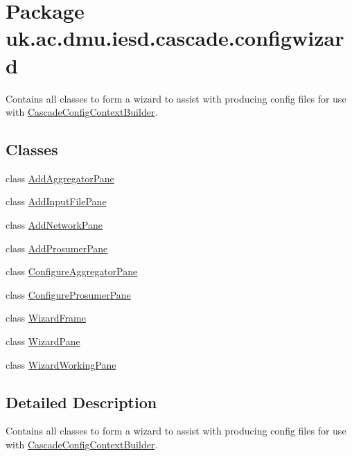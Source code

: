 \hypertarget{namespaceuk_1_1ac_1_1dmu_1_1iesd_1_1cascade_1_1configwizard}{\section{Package uk.\-ac.\-dmu.\-iesd.\-cascade.\-configwizard}
\label{namespaceuk_1_1ac_1_1dmu_1_1iesd_1_1cascade_1_1configwizard}
}


Contains all classes to form a wizard to assist with producing config files for use with \hyperlink{}{Cascade\-Config\-Context\-Builder}.  


\subsection*{Classes}
\begin{DoxyCompactItemize}
\item 
class \hyperlink{classuk_1_1ac_1_1dmu_1_1iesd_1_1cascade_1_1configwizard_1_1_add_aggregator_pane}{Add\-Aggregator\-Pane}
\item 
class \hyperlink{classuk_1_1ac_1_1dmu_1_1iesd_1_1cascade_1_1configwizard_1_1_add_input_file_pane}{Add\-Input\-File\-Pane}
\item 
class \hyperlink{classuk_1_1ac_1_1dmu_1_1iesd_1_1cascade_1_1configwizard_1_1_add_network_pane}{Add\-Network\-Pane}
\item 
class \hyperlink{classuk_1_1ac_1_1dmu_1_1iesd_1_1cascade_1_1configwizard_1_1_add_prosumer_pane}{Add\-Prosumer\-Pane}
\item 
class \hyperlink{classuk_1_1ac_1_1dmu_1_1iesd_1_1cascade_1_1configwizard_1_1_configure_aggregator_pane}{Configure\-Aggregator\-Pane}
\item 
class \hyperlink{classuk_1_1ac_1_1dmu_1_1iesd_1_1cascade_1_1configwizard_1_1_configure_prosumer_pane}{Configure\-Prosumer\-Pane}
\item 
class \hyperlink{classuk_1_1ac_1_1dmu_1_1iesd_1_1cascade_1_1configwizard_1_1_wizard_frame}{Wizard\-Frame}
\item 
class \hyperlink{classuk_1_1ac_1_1dmu_1_1iesd_1_1cascade_1_1configwizard_1_1_wizard_pane}{Wizard\-Pane}
\item 
class \hyperlink{classuk_1_1ac_1_1dmu_1_1iesd_1_1cascade_1_1configwizard_1_1_wizard_working_pane}{Wizard\-Working\-Pane}
\end{DoxyCompactItemize}


\subsection{Detailed Description}
Contains all classes to form a wizard to assist with producing config files for use with \hyperlink{}{Cascade\-Config\-Context\-Builder}. 